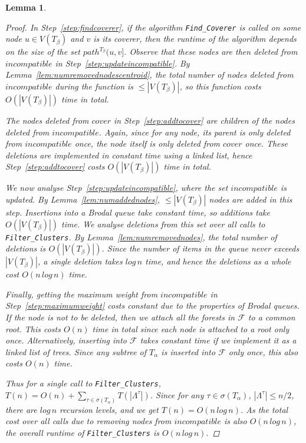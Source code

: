 \documentclass[12pt,a4paper]{article}
\newcommand{\leafset}{\Lambda}
\newcommand{\TA}{T_\alpha}
\newcommand{\TB}{T_\beta}
\newtheorem{filterclustersruntime}[incompatibility]{Lemma}
\begin{document}
\begin{filterclustersruntime}
\begin{proof}
            In Step~\ref{step:findcoverer}, if the algorithm \texttt{Find\_Coverer} is called on some node $u \in V(\TB)$ and $v$ is its coverer, then the runtime of the algorithm depends on the size of the set $path^{\TB}(u, v]$. Observe that these nodes are then deleted from $incompatible$ in Step~\ref{step:updateincompatible}. By Lemma~\ref{lem:numremovednodescentroid}, the total number of nodes deleted from $incompatible$ during the function is $\leq |V(\TB)|$, so this function costs $O(|V(\TB)|)$ time in total.

            The nodes deleted from $cover$ in Step~\ref{step:addtocover} are children of the nodes deleted from $incompatible$. Again, since for any node, its parent is only deleted from $incompatible$ once, the node itself is only deleted from $cover$ once. These deletions are implemented in constant time using a linked list, hence Step~\ref{step:addtocover} costs $O(|V(\TB)|)$ time in total.

            We now analyse Step~\ref{step:updateincompatible}, where the set $incompatible$ is updated. By Lemma~\ref{lem:numaddednodes}, $\leq |V(\TB)|$ nodes are added in this step. Insertions into a Brodal queue take constant time, so additions take $O(|V(\TB)|)$ time. We analyse deletions from this set over \textit{all} calls to \texttt{Filter\_Clusters}. By Lemma~\ref{lem:numremovednodes}, the total number of deletions is $O(|V(\TB)|)$. Since the number of items in the queue never exceeds $|V(\TB)|$, a single deletion takes $log\,n$ time, and hence the deletions as a whole cost $O(n\,log\,n)$ time.

            Finally, getting the maximum weight from $incompatible$ in Step~\ref{step:maximumweight} costs constant due to the properties of Brodal queues. If the node is not to be deleted, then we attach all the forests in $\mathcal{F}$ to a common root. This costs $O(n)$ time in total since each node is attached to a root only once. Alternatively, inserting into $\mathcal{F}$ takes constant time if we implement it as a linked list of trees. Since any subtree of $\TA$ is inserted into $\mathcal{F}$ only once, this also costs $O(n)$ time.

            Thus for a single call to \texttt{Filter\_Clusters}, $T(n) = O(n) + \sum_{\tau \in \sigma(\TA)} T(|\leafset^{\tau}|)$. Since for any $\tau \in \sigma(\TA)$, $|\leafset^{\tau}| \leq n/2$, there are $log\,n$ recursion levels, and we get $T(n) = O(n\,log\,n)$. As the total cost over all calls due to removing nodes from $incompatible$ is also $O(n\,log\,n)$, the overall runtime of \texttt{Filter\_Clusters} is $O(n\,log\,n)$.
        \end{proof}
    \end{filterclustersruntime}
\end{document}
